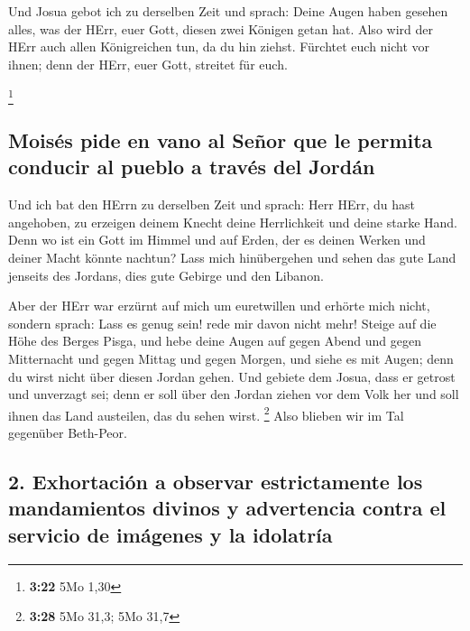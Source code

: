  Und Josua gebot ich zu derselben Zeit und sprach: Deine
Augen haben gesehen alles, was der HErr, euer Gott, diesen zwei Königen
getan hat. Also wird der HErr auch allen Königreichen tun, da du hin
ziehst.  Fürchtet euch nicht vor ihnen; denn der HErr,
euer Gott, streitet für euch.

\footnote{\textbf{3:22} 5Mo 1,30}

\hypertarget{moisuxe9s-pide-en-vano-al-seuxf1or-que-le-permita-conducir-al-pueblo-a-travuxe9s-del-jorduxe1n}{%
\subsection{Moisés pide en vano al Señor que le permita conducir al
pueblo a través del
Jordán}\label{moisuxe9s-pide-en-vano-al-seuxf1or-que-le-permita-conducir-al-pueblo-a-travuxe9s-del-jorduxe1n}}

 Und ich bat den HErrn zu derselben Zeit und sprach:
 Herr HErr, du hast angehoben, zu erzeigen deinem Knecht
deine Herrlichkeit und deine starke Hand. Denn wo ist ein Gott im Himmel
und auf Erden, der es deinen Werken und deiner Macht könnte nachtun?
 Lass mich hinübergehen und sehen das gute Land jenseits
des Jordans, dies gute Gebirge und den Libanon.

 Aber der HErr war erzürnt auf mich um euretwillen und
erhörte mich nicht, sondern sprach: Lass es genug sein! rede mir davon
nicht mehr!  Steige auf die Höhe des Berges Pisga, und
hebe deine Augen auf gegen Abend und gegen Mitternacht und gegen Mittag
und gegen Morgen, und siehe es mit Augen; denn du wirst nicht über
diesen Jordan gehen.  Und gebiete dem Josua, dass er
getrost und unverzagt sei; denn er soll über den Jordan ziehen vor dem
Volk her und soll ihnen das Land austeilen, das du sehen wirst.
\footnote{\textbf{3:28} 5Mo 31,3; 5Mo 31,7}  Also blieben
wir im Tal gegenüber Beth-Peor.

\hypertarget{exhortaciuxf3n-a-observar-estrictamente-los-mandamientos-divinos-y-advertencia-contra-el-servicio-de-imuxe1genes-y-la-idolatruxeda}{%
\subsection{2. Exhortación a observar estrictamente los mandamientos
divinos y advertencia contra el servicio de imágenes y la
idolatría}\label{exhortaciuxf3n-a-observar-estrictamente-los-mandamientos-divinos-y-advertencia-contra-el-servicio-de-imuxe1genes-y-la-idolatruxeda}}

